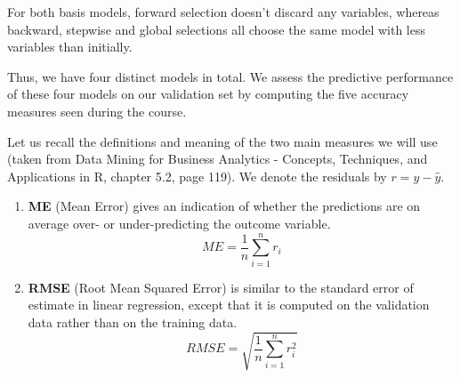 \documentclass[
  paper=a4,
  ,captions=tableheading
]{scrartcl}
\providecommand{\tightlist}{%
  \setlength{\itemsep}{0pt}\setlength{\parskip}{0pt}}
\begin{document}
\begin{table}[!h]

\caption{\label{tab:Variable Selection Summary}Predictors used in each linear model}
\centering
{}
\end{table}

For both basis models, forward selection doesn't discard any variables,
whereas backward, stepwise and global selections all choose the same
model with less variables than initially.

Thus, we have four distinct models in total. We assess the predictive
performance of these four models on our validation set by computing the
five accuracy measures seen during the course.

Let us recall the definitions and meaning of the two main measures we
will use (taken from Data Mining for Business Analytics - Concepts,
Techniques, and Applications in R, chapter 5.2, page 119). We denote the
residuals by \(r = y - \hat y\).

\begin{enumerate}
\def\labelenumi{\arabic{enumi}.}
\tightlist
\item
  \textbf{ME} (Mean Error) gives an indication of whether the
  predictions are on average over- or under-predicting the outcome
  variable. \[ME = \dfrac{1}{n} \sum_{i=1}^{n}r_i\]
\item
  \textbf{RMSE} (Root Mean Squared Error) is similar to the standard
  error of estimate in linear regression, except that it is computed on
  the validation data rather than on the training data.
  \[RMSE =  \sqrt{\dfrac{1}{n}\sum_{i=1}^{n}r_i^2}\]
\end{enumerate}
\end{document}
